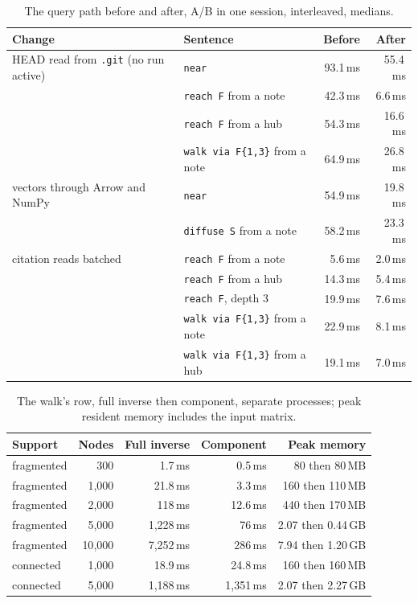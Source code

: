 \documentclass[11pt]{article}
\theoremstyle{plain}
\theoremstyle{definition}
\theoremstyle{remark}
\begin{document}
\begin{table}[ht]
\centering\small
\caption{The query path before and after, A/B in one session, interleaved, medians.}
\label{tab:changes}
\begin{tabular}{@{}llrr@{}}
\toprule
Change & Sentence & Before & After \\
\midrule
HEAD read from \texttt{.git} (no run active) & \texttt{near} & 93.1\,ms & 55.4\,ms \\
& \texttt{reach F} from a note & 42.3\,ms & 6.6\,ms \\
& \texttt{reach F} from a hub & 54.3\,ms & 16.6\,ms \\
& \texttt{walk via F\{1,3\}} from a note & 64.9\,ms & 26.8\,ms \\
\addlinespace
vectors through Arrow and NumPy & \texttt{near} & 54.9\,ms & 19.8\,ms \\
& \texttt{diffuse S} from a note & 58.2\,ms & 23.3\,ms \\
\addlinespace
citation reads batched & \texttt{reach F} from a note & 5.6\,ms & 2.0\,ms \\
& \texttt{reach F} from a hub & 14.3\,ms & 5.4\,ms \\
& \texttt{reach F}, depth 3 & 19.9\,ms & 7.6\,ms \\
& \texttt{walk via F\{1,3\}} from a note & 22.9\,ms & 8.1\,ms \\
& \texttt{walk via F\{1,3\}} from a hub & 19.1\,ms & 7.0\,ms \\
\bottomrule
\end{tabular}
\end{table}

\begin{table}[ht]
\centering\small
\caption{The walk's row, full inverse then component, separate processes; peak resident memory
includes the input matrix.}\label{tab:walk}
\begin{tabular}{@{}lrrrr@{}}
\toprule
Support & Nodes & Full inverse & Component & Peak memory \\
\midrule
fragmented & 300 & 1.7\,ms & 0.5\,ms & 80 then 80\,MB \\
fragmented & 1{,}000 & 21.8\,ms & 3.3\,ms & 160 then 110\,MB \\
fragmented & 2{,}000 & 118\,ms & 12.6\,ms & 440 then 170\,MB \\
fragmented & 5{,}000 & 1{,}228\,ms & 76\,ms & 2.07 then 0.44\,GB \\
fragmented & 10{,}000 & 7{,}252\,ms & 286\,ms & 7.94 then 1.20\,GB \\
connected & 1{,}000 & 18.9\,ms & 24.8\,ms & 160 then 160\,MB \\
connected & 5{,}000 & 1{,}188\,ms & 1{,}351\,ms & 2.07 then 2.27\,GB \\
\bottomrule
\end{tabular}
\end{table}
\end{document}

